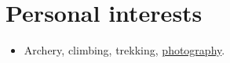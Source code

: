 \documentclass{tccv}
\begin{document}
\section{Personal interests}

\begin{itemize}
\item Archery, climbing, trekking,
\href{https://500px.com/romainbrault}{photography}.
\end{itemize}
\end{document}
